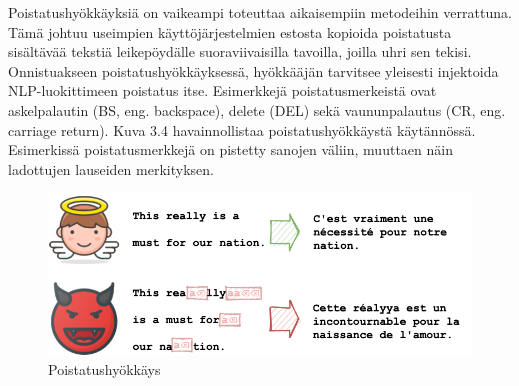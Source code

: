 Poistatushyökkäyksiä on vaikeampi toteuttaa aikaisempiin metodeihin verrattuna. Tämä johtuu useimpien käyttöjärjestelmien estosta kopioida poistatusta sisältävää tekstiä leikepöydälle suoraviivaisilla tavoilla, joilla uhri sen tekisi. Onnistuakseen poistatushyökkäyksessä, hyökkääjän tarvitsee yleisesti injektoida NLP-luokittimeen poistatus itse. Esimerkkejä poistatusmerkeistä ovat askelpalautin (BS, eng. backspace), delete (DEL) sekä vaununpalautus (CR, eng. carriage return). \citep{boucher2021bad}
Kuva 3.4 havainnollistaa poistatushyökkäystä käytännössä. Esimerkissä poistatusmerkkejä on pistetty sanojen väliin, muuttaen näin ladottujen lauseiden merkityksen.
\begin{figure}[t]
  \includegraphics[scale=0.599]{figures/backspace.png}
  \caption{Poistatushyökkäys \citep{boucher2021bad}}
\end{figure}